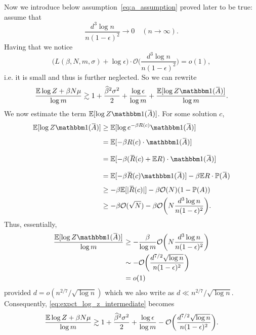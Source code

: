 Now we introduce below assumption~\eqref{eq:a_assumption} proved 
later to be true:
assume that 
\begin{equation} \label{eq:a_assumption}
  \frac{d^3 \log n}{n (1-\epsilon)^2} \to 0 \quad (n \to \infty). 
\end{equation}
Having that we notice 
\begin{equation}
  \bigl(L(\beta, N, m, \sigma) + \log \epsilon\bigr) 
      \cdot \mathcal{O}\biggl( \frac{d^3 \log n}{n (1-\epsilon)^2} \biggr)
    = o(1),
\end{equation}
i.e. it is small and thus is further neglected. So we can rewrite 
\begin{equation}\label{eq:expct_log_z_intermediate}
  \frac{\Expct \log Z + \beta N \mu}{\log m} 
    \gtrsim 1 + \frac{\hb^2 \sigma^2}{2} + \frac{\log\epsilon}{\log m}
      + \frac{\Expct[\log Z \Ind(\bar A)]}{\log m}.
\end{equation}
We now estimate the term $\Expct[\log Z \Ind(\bar A)]$.
For some solution $c$,
\begin{align}
  \Expct[\log Z \Ind(\bar A)] &\ge \Expct [\log e^{-\beta R(c)} \Ind(\bar A)] \notag \\
    &= \Expct[-\beta R(c) \cdot \Ind(\bar A)] \vphantom{\frac11} \notag \\
    &= \Expct[-\beta(\bar R(c) + \Expct R) \cdot \Ind(\bar A)] \vphantom{\frac11} \notag \\
    &= \Expct[-\beta \bar R(c) \Ind(\bar A)] - \beta \Expct R \cdot \Prob(\bar A) \vphantom{\frac11}\notag \\
    &\ge -\beta \Expct[|\bar R(c)|] - \beta \mathcal{O}(N) (1 - \Prob(A)) \notag \\
    &\ge -\beta \mathcal{O}(\sqrt{N}) - \beta \mathcal{O} 
      \biggl( N \frac{d^3 \log n}{n (1-\epsilon)^2} \biggr).
\end{align}
Thus, essentially,
\begin{align}
  \frac{\Expct[\log Z \Ind(\bar A)]}{\log m} 
    &\ge - \frac{\beta}{\log m} \mathcal{O} \biggl( N \frac{d^3 \log n}{n (1-\epsilon)^2 } \biggr) \notag \\
    &\sim - \mathcal{O} \biggl( \frac{d^{7/2} \sqrt{\log n}}{n (1-\epsilon)^2} \biggr) \notag \\
    &=o(1)
\end{align}
provided $d=o(n^{2/7}/\sqrt{\log n})$ which we also write as
$d\ll n^{2/7}/\sqrt{\log n}$.
Consequently, \eqref{eq:expct_log_z_intermediate}  becomes
\begin{equation}
  \frac{\mathbb{E} \log Z + \beta N \mu}{\log m} 
    \gtrsim 1 + \frac{\widehat{\beta}^2 \sigma^2}{2} + \frac{\log\epsilon}{\log m}
      - \mathcal{O} \biggl( \frac{d^{7/2} \sqrt{\log n}}{n (1-\epsilon)^2} \biggr).
\end{equation}

